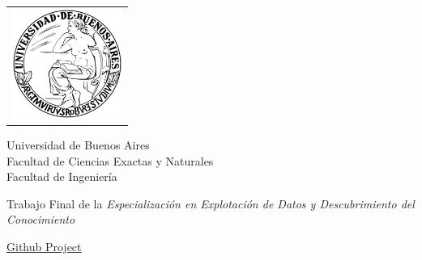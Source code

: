 \newcommand{\HRule}{\rule{\linewidth}{0.2mm}}
%
\thispagestyle{empty}

\begin{center}\leavevmode

\vspace{-2cm}

\begin{tabular}{l}
\includegraphics[width=3.6cm]{./images/logouba.png}
\end{tabular}


{\large \sc Universidad de Buenos Aires\\Facultad de Ciencias Exactas y Naturales \\ Facultad de Ingeniería}

\vspace{6.0cm}

\vspace{3.0cm}

\begin{huge}
\textbf{\tituloTesis}
\end{huge}

\vspace{2cm}

{\large Trabajo Final de la \textit{Especialización en Explotación de Datos y Descubrimiento del Conocimiento}}
\vspace{2cm}

{\large \href{https://github.com/adrianmarino/thesis-paper}{Github Project}}

\vspace{2cm}

{\Large \autor}

\end{center}

\vfill

{\large


\vspace{.2cm}


\vspace{.2cm}

\lugar
}

\newpage\thispagestyle{empty}
